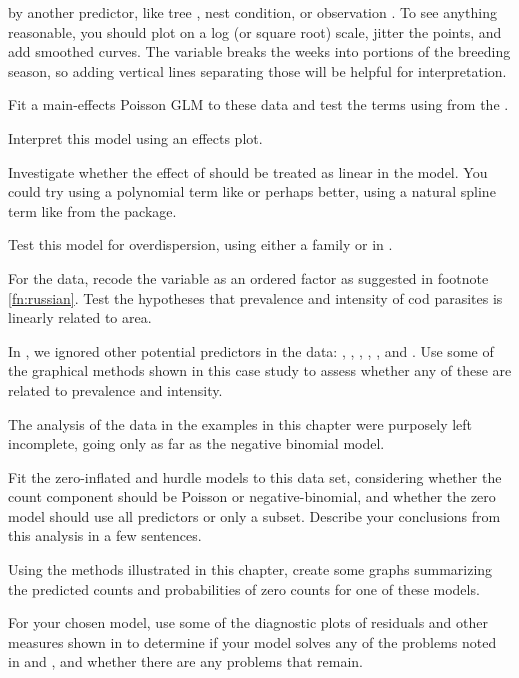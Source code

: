 \documentclass[11pt]{report}\usepackage[]{graphicx}\usepackage[]{color}
\begin{document}
\begin{Exercises}
\begin{enumerate*}
		by another predictor, like tree , nest condition, or observation
		. 
		To see anything reasonable,
		you should plot  on a log (or square root) scale, jitter the points, and add
		smoothed curves. The variable  breaks the weeks into portions of the
		breeding season, so adding vertical lines separating those will be helpful for interpretation.
		\item Fit a main-effects Poisson GLM to these data and test the terms using
		 from the .
		\item Interpret this model using an effects plot.
		\item Investigate whether the effect of  should be treated as linear in the
		model.  You could try using a polynomial term like  or
		perhaps better, using a natural spline term like  from the  package.
    \item \begin{sloppypar} Test this model for overdispersion, using either a  family or
     in . \end{sloppypar}
	\end{enumerate*}		

  \exercise For the  data, recode the  variable as an ordered factor as suggested in
  footnote \ref{fn:russian}.  Test the hypotheses that prevalence and intensity of cod parasites is linearly
  related to area.

  \exercise In , we ignored other potential predictors in the  data:
  , , , , , and .
  Use some of the graphical methods shown in this case study to assess whether any of these are related
  to prevalence and intensity.

  \exercise The analysis of the  data in the examples in this chapter were purposely left incomplete,
  going only as far as the negative binomial model.
  \begin{enumerate*}
    \item Fit the zero-inflated and hurdle models to this data set, considering whether the count component should
    be Poisson or negative-binomial, and whether the zero model should use all predictors or only a subset.
    Describe your conclusions from this analysis in a few sentences.
    \item Using the methods illustrated in this chapter, create some graphs summarizing the predicted counts
    and probabilities of zero counts for one of these models.
    \item For your chosen model, use some of the diagnostic plots of residuals and other measures shown in
     to determine if your model solves any of the problems noted in 
    and , and whether there are any problems that remain.
  \end{enumerate*}


\end{Exercises}
\end{document}
